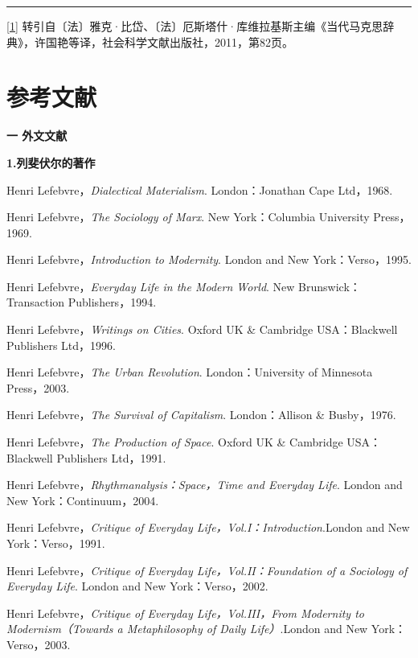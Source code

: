 \documentclass[UTF8, fontset = sourcesans, a4paper, oneside, zihao =
-4, scheme=chinese, no-math, space=true]{ctexbook}
\begin{document}
\begin{center}\rule{0.5\linewidth}{\linethickness}\end{center}

\protect\hypertarget{part0011.htmlux5cux23m1}{}{}\protect\hyperlink{part0011.htmlux5cux23w1}{{[}1{]}}
转引自〔法〕雅克·比岱、〔法〕厄斯塔什·库维拉基斯主编《当代马克思辞典》，许国艳等译，社会科学文献出版社，2011，第82页。

\protect\hypertarget{part0012.html}{}{}

\hypertarget{part0012.htmlux5cux23a012}{\chapter{参考文献}\label{part0012.htmlux5cux23a012}}

\textbf{一 外文文献}

\textbf{1.列斐伏尔的著作}

Henri Lefebvre，\emph{Dialectical Materialism}. London：Jonathan Cape
Ltd，1968.

Henri Lefebvre，\emph{The Sociology of Marx}. New York：Columbia
University Press，1969.

Henri Lefebvre，\emph{Introduction to Modernity}. London and New
York：Verso，1995.

Henri Lefebvre，\emph{Everyday Life in the Modern World}. New
Brunswick：Transaction Publishers，1994.

Henri Lefebvre，\emph{Writings on Cities}. Oxford UK \& Cambridge
USA：Blackwell Publishers Ltd，1996.

Henri Lefebvre，\emph{The Urban Revolution}. London：University of
Minnesota Press，2003.

Henri Lefebvre，\emph{The Survival of Capitalism}. London：Allison \&
Busby，1976.

Henri Lefebvre，\emph{The Production of Space}. Oxford UK \& Cambridge
USA：Blackwell Publishers Ltd，1991.

Henri Lefebvre，\emph{Rhythmanalysis：Space，Time and Everyday Life}.
London and New York：Continuum，2004.

Henri Lefebvre，\emph{Critique of Everyday
Life，Vol.I：Introduction}.London and New York：Verso，1991.

Henri Lefebvre，\emph{Critique of Everyday Life，Vol.II：Foundation of a
Sociology of Everyday Life}. London and New York：Verso，2002.

Henri Lefebvre，\emph{Critique of Everyday Life，Vol.III，From Modernity
to Modernism（Towards a Metaphilosophy of Daily Life）}.London and New
York：Verso，2003.
\end{document}

